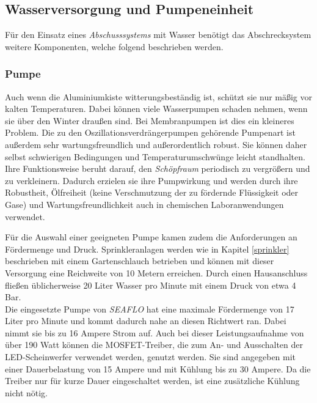 \subsection{Wasserversorgung und Pumpeneinheit}

Für den Einsatz eines \textit{Abschusssystems} mit Wasser benötigt das Abschrecksystem weitere Komponenten, welche folgend beschrieben werden.

\subsubsection{Pumpe} \label{cap:pumpe}


Auch wenn die Aluminiumkiste witterungsbeständig ist, schützt sie nur mäßig vor kalten Temperaturen. Dabei können viele Wasserpumpen schaden nehmen, wenn sie über den Winter draußen sind. Bei Membranpumpen ist dies ein kleineres Problem. Die zu den Oszillationsverdrängerpumpen gehörende Pumpenart ist außerdem sehr wartungsfreundlich und außerordentlich robust. Sie können daher selbst schwierigen Bedingungen und Temperaturumschwünge leicht standhalten.
\\
Ihre Funktionsweise beruht darauf, den \textit{Schöpfraum} periodisch zu vergrößern und zu verkleinern. Dadurch erzielen sie ihre Pumpwirkung und werden durch ihre Robustheit, Ölfreiheit (keine Verschmutzung der zu fördernde Flüssigkeit oder Gase) und Wartungsfreundlichkeit auch in chemischen Laboranwendungen verwendet. \cite{Jousten2018}

Für die Auswahl einer geeigneten Pumpe kamen zudem die Anforderungen an Fördermenge und Druck. Sprinkleranlagen werden wie in Kapitel \ref{sprinkler} beschrieben mit einem Gartenschlauch betrieben und können mit dieser Versorgung eine Reichweite von 10 Metern erreichen. Durch einen Hausanschluss fließen üblicherweise 20 Liter Wasser pro Minute mit einem Druck von etwa 4 Bar.\\
Die eingesetzte Pumpe von \textit{SEAFLO} hat eine maximale Fördermenge von 17 Liter pro Minute und kommt dadurch nahe an diesen Richtwert ran. Dabei nimmt sie bis zu 16 Ampere Strom auf. Auch bei dieser Leistungsaufnahme von über 190 Watt können die MOSFET-Treiber, die zum An- und Ausschalten der LED-Scheinwerfer verwendet werden, genutzt werden. Sie sind angegeben mit einer Dauerbelastung von 15 Ampere und mit Kühlung bis zu 30 Ampere. Da die Treiber nur für kurze Dauer eingeschaltet werden, ist eine zusätzliche Kühlung nicht nötig. \cite{mosfets_am,seaflo_pump}

